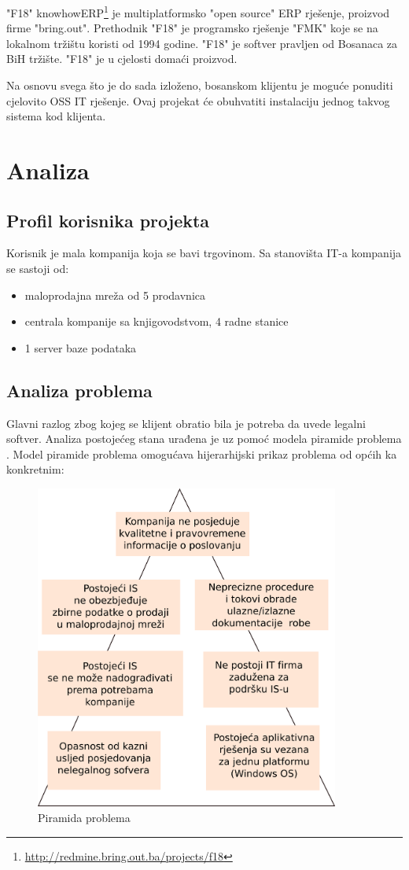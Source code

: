 \documentclass[times, utf8, seminar]{fit}
\begin{document}
"F18" knowhowERP\footnote{\url{http://redmine.bring.out.ba/projects/f18}} je multiplatformsko "open source" ERP rješenje, proizvod firme "bring.out". Prethodnik "F18" je programsko rješenje "FMK" koje se na lokalnom tržištu koristi od 1994 godine. "F18" je softver pravljen od Bosanaca za BiH tržište. "F18" je u cjelosti domaći proizvod.

Na osnovu svega što je do sada izloženo, bosanskom klijentu je moguće ponuditi cjelovito OSS IT rješenje.  Ovaj projekat će obuhvatiti instalaciju jednog takvog sistema kod klijenta.

\chapter{Analiza}

\section{Profil korisnika projekta}
Korisnik je mala kompanija koja se bavi trgovinom. Sa stanovišta IT-a kompanija se sastoji od:
\begin{itemize}
  \item maloprodajna mreža od 5 prodavnica
  \item centrala kompanije sa knjigovodstvom, 4 radne stanice
  \item 1 server baze podataka 
\end{itemize}
\pagebreak
\section{Analiza problema}
Glavni razlog zbog kojeg se klijent obratio bila je potreba da uvede legalni softver. Analiza postojećeg stana urađena je uz pomoć modela piramide problema \citep{prasopro}. Model piramide problema omogućava hijerarhijski prikaz problema od općih ka konkretnim: 

\begin{figure}[H]
\centering
\includegraphics[width=10cm]{img/piramida_problema.png}
\caption{Piramida problema}
\end{figure}
\end{document}

